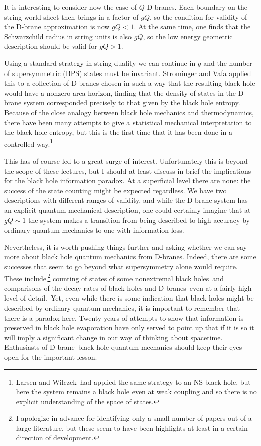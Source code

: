 It is interesting to consider now the case of $Q$ D-branes.  Each boundary on
the string world-sheet then brings in a factor of $gQ$, so the condition for
validity of the D-brane approximation is now $gQ < 1$.  At the same time, one
finds that the Schwarzchild radius in string units is also $gQ$, so the
low energy geometric description should be valid for $gQ > 1$.

Using a standard strategy in string duality we can continue in $g$ and the
number of supersymmetric (BPS) states must be invariant.  Strominger and Vafa
applied this to a collection of D-branes chosen in such a way that the
resulting black hole would have a nonzero area horizon, finding that the
density of states in the D-brane system corresponded precisely to that given
by the black hole entropy.\cite{sv}  Because of the close analogy between
black hole mechanics and thermodynamics, there have been many attempts to
give a statistical mechanical interpretation to the black hole entropy, but
this is the first time that it has been done in a controlled way.\footnote
{Larsen and Wilczek\,\cite{larwil} had applied the same strategy to an NS black
hole, but here the system remains a black hole even at weak coupling and so
there is no explicit understanding of the space of states.}

This has of course led to a great surge of interest.  Unfortunately this
is beyond the scope of these lectures, but I should at least discuss in brief
the implications for the black hole information paradox.  At a superficial
level there are none: the success of the state counting might be expected
regardless.  We have two descriptions with different ranges of validity, and
while the D-brane system has an explicit quantum mechanical description, one
could certainly imagine that at
$gQ \sim 1$ the system makes a transition from being described to high accuracy
by ordinary quantum mechanics to one with information loss.

Nevertheless, it
is worth pushing things further and asking whether we can say more about black
hole quantum mechanics from D-branes.  Indeed, there are some successes that
seem to go beyond what supersymmetry alone would require.  These
include\,\footnote
{I apologize in advance for identifying only a small number of papers out of
a large literature, but these seem to have been highlights at least in a
certain direction of development.} counting of states of some nonextremal
black holes\,\cite{nonex} and comparisons of the decay rates of black holes and
D-branes\,\cite{decay} even at a fairly high level of detail.\,\cite{grey} 
Yet, even while there is some indication that black holes might be described by
ordinary quantum mechanics, it is important to remember that there is a paradox
here.  Twenty years of attempts to show that information is preserved in black
hole evaporation have only served to point up that if it is so it will imply
a significant change in our way of thinking about spacetime.  Enthusiasts of
D-brane--black hole quantum mechanics should keep their eyes open for the
important lesson.

